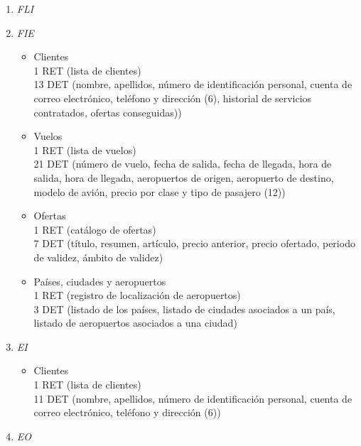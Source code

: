 \begin{enumerate}
	\item\textit{ FLI}
	\item\textit{ FIE}

		\begin{itemize}
			\item Clientes \\
			{1 RET (lista de clientes)}\\
			{13 DET (nombre, apellidos, número de identificación personal, cuenta de correo electrónico, teléfono y dirección (6),
			historial de servicios contratados, ofertas conseguidas))}\\
			\item Vuelos \\
			{1 RET (lista de vuelos)}\\
			{21 DET (número de vuelo, fecha de salida, fecha de llegada, hora de salida, hora de llegada, aeropuertos de origen,
			aeropuerto de destino, modelo de avión, precio por clase y tipo de pasajero (12))}\\
			\item Ofertas \\
			{1 RET (catálogo de ofertas)}\\
			{7 DET (título, resumen, artículo, precio anterior, precio ofertado, periodo de validez, ámbito de validez)}\\
			\item Países, ciudades y aeropuertos \\
			{1 RET (registro de localización de aeropuertos)}\\
			{3 DET (listado de los países, listado de ciudades asociados a un país, listado de aeropuertos asociados a una ciudad)}\\
		\end{itemize}

	\item \textit{EI}

		\begin{itemize}
			\item Clientes \\
			{1 RET (lista de clientes)}\\
			{11 DET (nombre, apellidos, número de identificación personal, cuenta de correo electrónico, teléfono y dirección (6))}\\
		\end{itemize}

	\item \textit{EO}


\end{enumerate}
